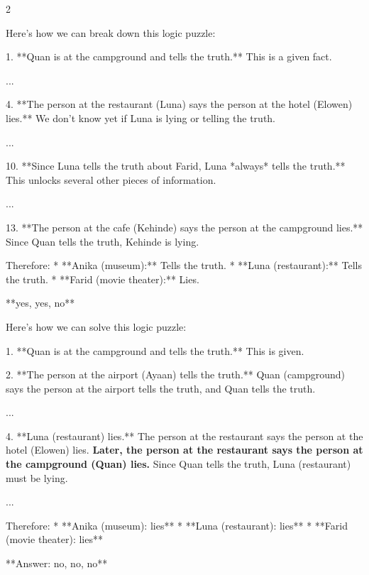 \begin{paracol}{2}

\switchcolumn[0]
\begin{tcolorbox}[breakable, colframe=mydarkgreen!70, colback=mydarkgreen!10, title=Correct response]
Here's how we can break down this logic puzzle:

1. **Quan is at the campground and tells the truth.** This is a given fact.

...

4. **The person at the restaurant (Luna) says the person at the hotel (Elowen) lies.**  We don't know yet if Luna is lying or telling the truth.

...

10. **Since Luna tells the truth about Farid, Luna *always* tells the truth.**  This unlocks several other pieces of information.

...

13. **The person at the cafe (Kehinde) says the person at the campground lies.** Since Quan tells the truth, Kehinde is lying.

Therefore:
* **Anika (museum):** Tells the truth.
* **Luna (restaurant):** Tells the truth.
* **Farid (movie theater):** Lies.

**yes, yes, no**
\end{tcolorbox}

\switchcolumn
\begin{tcolorbox}[breakable, colframe=red!70, colback=red!10, title=Incorrect Response Due to Hallucination]
Here's how we can solve this logic puzzle:

1. **Quan is at the campground and tells the truth.** This is given.

2. **The person at the airport (Ayaan) tells the truth.** Quan (campground) says the person at the airport tells the truth, and Quan tells the truth.

...

4. **Luna (restaurant) lies.**  The person at the restaurant says the person at the hotel (Elowen) lies. \textbf{\color{red} Later, the person at the restaurant says the person at the campground (Quan) lies.} Since Quan tells the truth, Luna (restaurant) must be lying.

...

Therefore:
* **Anika (museum): lies**
* **Luna (restaurant): lies**
* **Farid (movie theater): lies**

**Answer: no, no, no** 
\end{tcolorbox}
\end{paracol}

